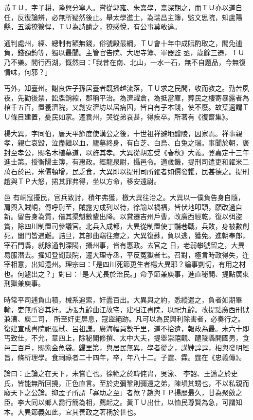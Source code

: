 \begin{pinyinscope}
 黃ＴＵ，字子耕，隆興分寧人。嘗從郭雍、朱熹學，熹深期之，而ＴＵ亦以道自任，反復論辨，必無所疑然後止。舉太學進士，為瑞昌主簿，監文思院，知盧陽縣，五溪獠獷悍，ＴＵ為詩諭之，獠感悅，有公事莫敢違。



 通判處州，經、總制有額無錢，俗號殿最綱，ＴＵ會十年中成賦酌取之，閣免逋負，錢額鈞等，獨以最聞。主管官告院、大理寺簿、軍器監
 丞，歲餘三遷，ＴＵ乃不樂。間行西湖，慨然曰：「我昔在南、北山，一水一石，無不自題品，今無復情味，何邪？」



 丐外，知臺州。謝良佐子孫居臺者既播越流落，ＴＵ求之民間，收而教之。勤苦夙夜，先勸後禁，訟牒銷縮，郡稱平治。為濟糶倉，為抵當庫，葬民之棲寄暴露者為棺千五百，置養濟院，又創安濟坊以居病囚，皆自有子本錢，使不廢。故葉適謂ＴＵ條目建置，憂民如家。遷袁州，哭從弟哀甚，得疾卒。所著有《復齋集》。



 楊大異，字同伯，唐天平節度使漢公之後，十世祖祥避地醴陵，因家焉。祥事親孝，親亡哀毀，泣盡繼以血，廬墓終身，有白芝、白烏、白兔之瑞。事聞於朝，褒封至孝公，賜名木植墓道，以旌其孝。大異從胡宏受《春秋》大義。登嘉定十三年進士第。授衡陽主簿，有惠政。經龍泉尉，攝邑令。適歲饑，提刑司遣吏和糴米二萬石於邑，米價頓增，民乏食，大異即以提刑司所糴者如價發糶，民甚德之。提刑趙與ＴＰ大怒，捃其罪弗得，坐以方命，移安遠尉。



 邑
 有峒寇擾民，官兵致討，積年弗獲，檄大異往治之。大異以一僕負告身自隨，肩輿入賊峒，傳呼尉至，賊露刃成列以待，徐諭以禍福，皆伏地叩頭，願改過自新。留告身為質，偕其渠魁數輩出降。以賞遷吉州戶曹，改廣西經乾，復以弭盜賞，除四川制置司參議官。北兵入成都，大異從制置使丁黼巷戰，兵敗，身被數創死，闔門皆遇難。詰旦，其部曲竊往瘞之，大異復蘇，負以逃，獲免。進朝奉郎，宰石門縣，就除通判溧陽，攝州事，皆有惠政。去官之
 日，老弱攀號留之，大異易服潛去。擢知登聞鼓院，遷大理寺丞，平反冤獄者七。召對，極言時政得失，迕宰相意，出知澧州。理宗曰：「是四川死節更生者楊大異耶？論事剴切，有用之材也。何遽出之？」對曰：「是人尤長於治民。」命予節兼庾事，進直秘閣、提點廣東刑獄兼庾事。



 時常平司逋負山積，械系追索，奸蠹百出。大異與之約，悉縱遣之，負者如期畢輸，吏無所容其奸。訪張九齡曲江故宅，建相江書院，以祀九齡。改提點廣西刑獄兼漕、庾二司，
 所至奸吏屏息，寇盜絕跡。凡可以為民興利除害者，必奏行之。復建宣成書院祀張栻、呂祖謙。廣海幅員數千里，道不拾遺，報政為最。未六十即丐致仕，不允，章四上，除秘閣修撰、太中大夫，提舉崇禧觀、醴陵縣開國男，食邑三百戶，賜紫金魚袋。歸里第，與居民無異，學者從之，講肄諄諄，相與發明經旨，條析理學。食祠祿者二十四年，卒，年八十二。子霆、霖。霆在《忠義傳》。



 論曰：正論之在天下，未嘗亡也。徐範之於韓侂胄，吳泳、
 李韶、王邁之於史氏，皆能無所回撓，正色直言。至於史彌鞏則彌遠之弟，陳塤其甥也，不以私親而廢天下之公論。抑孟子所謂「寡助之至」者歟？趙與ＴＰ揚歷最久，甘為聚斂之臣。李大同以鄉人喬行簡為相，薦起之。黃ＴＵ出仕，以恤民尊賢為急，可謂知本。大異節義如此，宜其善政之著稱於世也。



\end{pinyinscope}